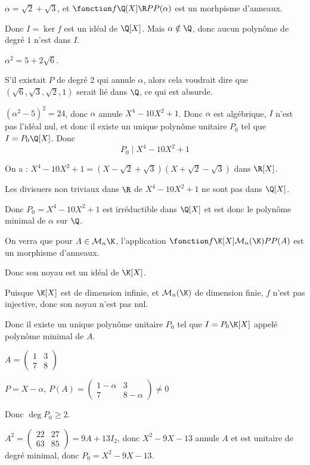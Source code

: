 \begin{exemple}
    $\alpha = \sqrt 2 + \sqrt 3$, et $\fonction f {\Q[X]} \R P {P(\alpha)}$ est un morhpisme d'anneaux.

    Donc $I = \ker f$ est un idéal de $\Q[X]$. Mais $\alpha \notin \Q$, donc aucun 
    polynôme de degré $1$ n'est dans $I$.

    $\alpha^2 = 5 + 2 \sqrt 6$. 

    S'il existait $P$ de degré 2 qui annule $\alpha$, alors cela voudrait dire que 
    $(\sqrt 6, \sqrt 3, \sqrt 2, 1)$ serait lié dans $\Q$, ce qui est absurde. 

    $(\alpha^2 - 5)^2 = 24$, donc $\alpha$ annule $X^4 - 10 X^2 + 1$. Donc $\alpha$ est algébrique, 
    $I$ n'est pas l'idéal nul, et donc il existe un unique polynôme unitaire $P_0$ tel que
    $I = P_0 \Q[X]$.
    Donc $$P_0 \mid X^4 - 10 X^2 + 1$$

    On a : $X^4 - 10 X^2 + 1 = (X - \sqrt 2 + \sqrt 3)(X + \sqrt 2 - \sqrt 3)$ dans $\R[X]$.

    Les divisuers non triviaux dans $\R$ de $X^4 - 10 X^2 + 1$ ne sont pas dans $\Q[X]$.

    Donc $P_0 = X^4 - 10 X^2 + 1$ est irréductible dans $\Q[X]$ et est donc le polynôme minimal de
    $\alpha$ sur $\Q$.
\end{exemple}

\begin{exemple}
    On verra que pour $A \in \mathcal M_n{\K}$, l'application $\fonction f {\K[X]}{\mathcal M_n(\K)}{P}{P(A)}$ est un morphisme d'anneaux.

    Donc son noyau est un idéal de $\K[X]$.

    Puisque $\K[X]$ est de dimension infinie, et $\mathcal M_n(\K)$ de dimension finie,
    $f$ n'est pas injective, donc son noyau n'est pas nul.

    Donc il existe un unique polynôme unitaire $P_0$ tel que $I = P_0 \K[X]$ appelé polynôme
    minimal de $A$.

    \avspace $A = \begin{pmatrix}
        1 & 3 \\
        7 & 8
    \end{pmatrix}$

    $P = X - \alpha$, $P(A) = \begin{pmatrix}
        1 - \alpha & 3 \\
        7 & 8 - \alpha
    \end{pmatrix} \neq 0 $

    Donc $\deg P_0 \geqslant 2$.

    $A^2 = \begin{pmatrix}
        22 & 27 \\
        63 & 85
    \end{pmatrix} = 9A + 13 I_2$, donc $X^2 - 9X - 13$ annule $A$ et est unitaire de degré minimal, 
    donc $P_0 = X^2 - 9X - 13$.


\end{exemple}


